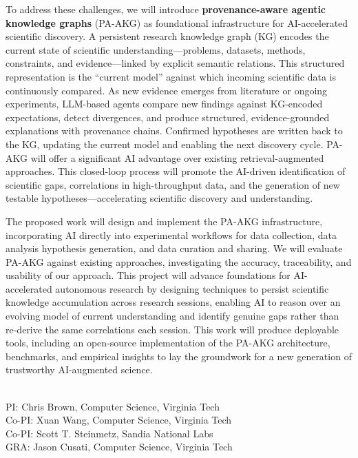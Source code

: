 \documentclass{files/proposalnsf}
\begin{document}
To address these challenges, we will introduce \textbf{provenance-aware agentic knowledge graphs} (PA-AKG) as foundational infrastructure for AI-accelerated scientific discovery. A persistent research knowledge graph (KG) encodes the current state of scientific understanding---problems, datasets, methods, constraints, and evidence---linked by explicit semantic relations. This structured representation is the ``current model'' against which incoming scientific data is continuously compared. As new evidence emerges from literature or ongoing experiments, LLM-based agents compare new findings against KG-encoded expectations, detect divergences, and produce structured, evidence-grounded explanations with provenance chains. Confirmed hypotheses are written back to the KG, updating the current model and enabling the next discovery cycle. PA-AKG will offer a significant AI advantage over existing retrieval-augmented approaches. This closed-loop process will promote the AI-driven identification of scientific gaps, correlations in high-throughput data, and the generation of new testable hypotheses---accelerating scientific discovery and understanding.


The proposed work will design and implement the PA-AKG infrastructure, incorporating AI directly into experimental workflows for data collection, data analysis hypothesis generation, and data curation and sharing. We will evaluate PA-AKG against existing approaches, investigating the accuracy, traceability, and usability of our approach. This project will advance foundations for AI-accelerated autonomous research by designing techniques to persist scientific knowledge accumulation across research sessions, enabling AI to reason over an evolving model of current understanding and identify genuine gaps rather than re-derive the same correlations each session. This work will produce deployable tools, including an open-source implementation of the PA-AKG architecture, benchmarks, and empirical insights to lay the groundwork for a new generation of trustworthy AI-augmented science.

\newpage
{}

\begin{center}
    \large{\proposalEleven} \\ \vspace{0.5pt}
\footnotesize{PI: Chris Brown, Computer Science, Virginia Tech} \\
\footnotesize{Co-PI: Xuan Wang, Computer Science, Virginia Tech} \\
\footnotesize{Co-PI: Scott T. Steinmetz, Sandia National Labs} \\
\footnotesize{GRA: Jason Cusati, Computer Science, Virginia Tech}
\end{center}\vspace{-15pt}
\end{document}
